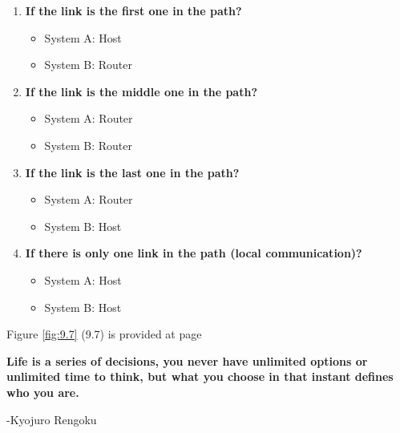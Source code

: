 \documentclass{article}
\begin{document}
\begin{enumerate}
	\item \textbf{ If the link is the first one in the path? }
	      \begin{itemize}
		      \item System A: Host
		      \item System B: Router
	      \end{itemize}
	\item \textbf{ If the link is the middle one in the path? }
	      \begin{itemize}
		      \item System A: Router
		      \item System B: Router
	      \end{itemize}
	\item \textbf{ If the link is the last one in the path? }
	      \begin{itemize}
		      \item System A: Router
		      \item System B: Host
	      \end{itemize}
	\item \textbf{ If there is only one link in the path (local communication)? }
	      \begin{itemize}
		      \item System A: Host
		      \item System B: Host
	      \end{itemize}
\end{enumerate}

Figure \ref{fig:9.7} (9.7) is provided at page \pageref{fig:9.7}


\vspace{10cm}
\textbf{
	Life is a series of decisions, you never have unlimited options or unlimited time to think, but what you choose in that instant defines who you are. 
}
\begin{flushright}
	-Kyojuro Rengoku
\end{flushright}
\end{document}
